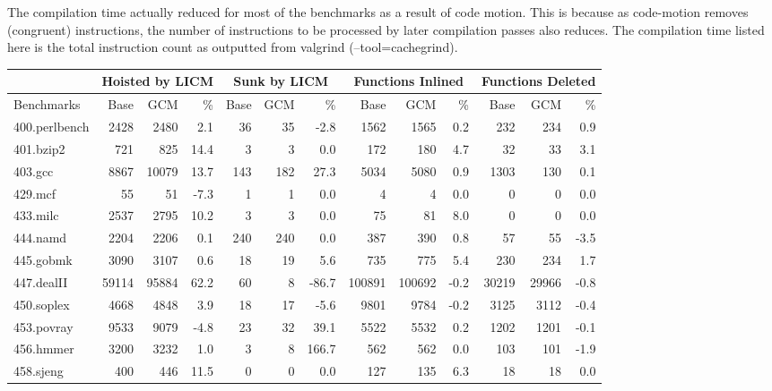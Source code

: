 \documentclass[acmlarge,review,anonymous]{acmart}\settopmatter{printfolios=true}
\begin{document}
The compilation time actually reduced for most of the benchmarks as a result of code motion.
This is because as code-motion removes (congruent) instructions, the number of instructions
to be processed by later compilation passes also reduces. The compilation time listed here
is the total instruction count as outputted from valgrind (--tool=cachegrind).


\begin{table}[h!]
  \begin{center}
    \begin{tabular}{|l|r|r|r|r|r|r|r|r|r|r|r|r|}
      \hline
  &  \multicolumn{3}{|c|}{Hoisted by LICM} &\multicolumn{3}{|c|}{Sunk by LICM} &\multicolumn{3}{|c|}{Functions Inlined} &  \multicolumn{3}{|c|}{Functions Deleted} \\\hline
 Benchmarks       & Base        & GCM	& \%  &Base     & GCM   &\%    & Base	& GCM	  &\%   & Base	& GCM	& \% \\\hline
 400.perlbench	  & 2428	& 2480	& 2.1 & 36	& 35	& -2.8 & 1562	& 1565	  & 0.2 & 232	& 234	& 0.9  \\\hline
 401.bzip2	  & 721	        & 825	& 14.4& 3	& 3	& 0.0  & 172	& 180	  & 4.7 & 32	& 33	& 3.1  \\\hline
 403.gcc	  & 8867	& 10079	& 13.7& 143	& 182	& 27.3 & 5034	& 5080	  & 0.9 & 1303	& 130	& 0.1  \\\hline
 429.mcf	  & 55	        & 51	& -7.3& 1	& 1	& 0.0  & 4	& 4	  & 0.0 & 0 	& 0	& 0.0  \\\hline
 433.milc	  & 2537	& 2795	& 10.2& 3	& 3	& 0.0  & 75	& 81	  & 8.0 & 0	& 0	& 0.0  \\\hline
 444.namd	  & 2204	& 2206	& 0.1 & 240	& 240	& 0.0  & 387	& 390	  & 0.8 & 57	& 55	& -3.5 \\\hline
 445.gobmk	  & 3090	& 3107	& 0.6 & 18	& 19	& 5.6  & 735	& 775	  & 5.4 & 230	& 234	& 1.7  \\\hline
 447.dealII	  & 59114	& 95884	& 62.2& 60	& 8	& -86.7& 100891& 100692  & -0.2& 30219	& 29966	& -0.8 \\\hline
 450.soplex	  & 4668	& 4848	& 3.9 & 18	& 17	& -5.6 & 9801	& 9784	  & -0.2& 3125	& 3112	& -0.4 \\\hline
 453.povray	  & 9533	& 9079	& -4.8& 23	& 32	& 39.1 & 5522	& 5532	  & 0.2 & 1202	& 1201	& -0.1 \\\hline
 456.hmmer	  & 3200	& 3232	& 1.0 & 3	& 8	& 166.7& 562	& 562	  & 0.0 & 103	& 101	& -1.9 \\\hline
 458.sjeng	  & 400	        & 446	& 11.5& 0	& 0	& 0.0  & 127	& 135	  & 6.3 & 18	& 18	& 0.0  \\\hline

\end{tabular}
\end{center}
\end{table}
\end{document}
